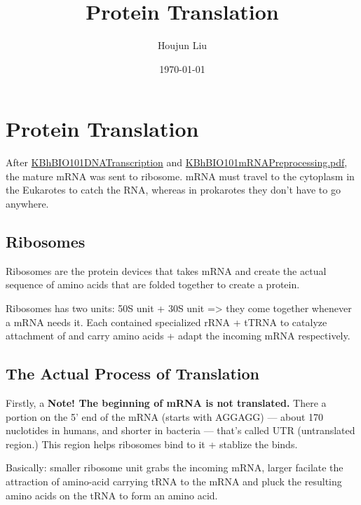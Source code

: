 \documentclass[letterpaper]{article}
\author{Houjun Liu}
\date{\today}
\title{Protein Translation}
\renewcommand\maketitle{}
\begin{document}
\maketitle


\section{Protein Translation}
\label{sec:org4611162}
After \href{KBhBIO101DNATranscription.org}{KBhBIO101DNATranscription}
and
\href{KBhBIO101mRNAPreprocessing.pdf.org}{KBhBIO101mRNAPreprocessing.pdf},
the mature mRNA was sent to ribosome. mRNA must travel to the cytoplasm
in the Eukarotes to catch the RNA, whereas in prokarotes they don't have
to go anywhere.

\subsection{Ribosomes}
\label{sec:org949d5b7}
Ribosomes are the protein devices that takes mRNA and create the actual
sequence of amino acids that are folded together to create a protein.

Ribosomes has two units: 50S unit + 30S unit => they come together
whenever a mRNA needs it. Each contained specialized rRNA + tTRNA to
catalyze attachment of and carry amino acids + adapt the incoming mRNA
respectively.

\subsection{The Actual Process of Translation}
\label{sec:orge505a0a}
Firstly, a \textbf{Note! The beginning of mRNA is not translated.} There a
portion on the 5' end of the mRNA (starts with AGGAGG) --- about 170
nuclotides in humans, and shorter in bacteria --- that's called UTR
(untranslated region.) This region helps ribosomes bind to it + stablize
the binds.

Basically: smaller ribosome unit grabs the incoming mRNA, larger
facilate the attraction of amino-acid carrying tRNA to the mRNA and
pluck the resulting amino acids on the tRNA to form an amino acid.
\end{document}
